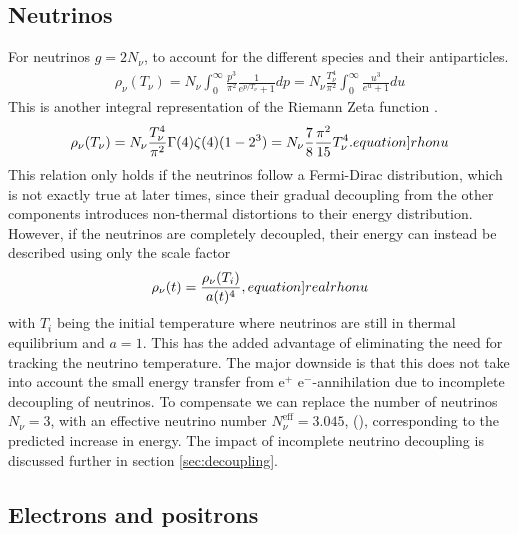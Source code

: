 \subsection{Neutrinos}
\label{sec:rhoNeutrino}
For neutrinos $g=2N_\nu$, to account for the different species and their antiparticles.
\begin{align}
    \rho_\nu(T_\nu)=N_\nu\int_{0}^{\infty} \frac{p^3}{\pi^2}\frac{1}{e^{p/T_\nu}+1}dp =  N_\nu\frac{T_\nu^4}{\pi^2}\int_{0}^{\infty}\frac{u^3}{e^{u}+1}du
\end{align}
This is another integral representation of the Riemann Zeta function \cite[\href{https://dlmf.nist.gov/25.5.E3}{(25.5.3)}]{NIST:DLMF}.
\begin{align}
    \rho_\nu(T_\nu)=N_\nu\frac{T_\nu^4}{\pi^2}\Gamma(4)\zeta(4)(1-2^3)=N_\nu\frac{7}{8}\frac{\pi^2}{15}T_\nu^4.
    \label[equation]{rhonu}
\end{align}
This relation only holds if the neutrinos follow a Fermi-Dirac distribution, which is not exactly true at later times, since their gradual decoupling from the other components introduces non-thermal distortions to their energy distribution. However, if the neutrinos are completely decoupled, their energy can instead be described using only the scale factor 
\begin{align}
    \rho_\nu(t)=\frac{\rho_\nu(T_i)}{a(t)^4},
    \label[equation]{realrhonu}
\end{align}
with $T_i$ being the initial temperature where neutrinos are still in thermal equilibrium and $a=1$. This has the added advantage of eliminating the need for tracking the neutrino temperature. The major downside is that this does not take into account the small energy transfer from e${^+}$ e${^-}$-annihilation due to incomplete decoupling of neutrinos. To compensate we can replace the number of neutrinos $N_\nu=3$, with an effective neutrino number $N_\nu^\text{eff}=3.045$, (\textcite{de_Salas_2016}), corresponding to the predicted increase in energy. The impact of incomplete neutrino decoupling is discussed further in section \ref{sec:decoupling}.




\subsection{Electrons and positrons}


